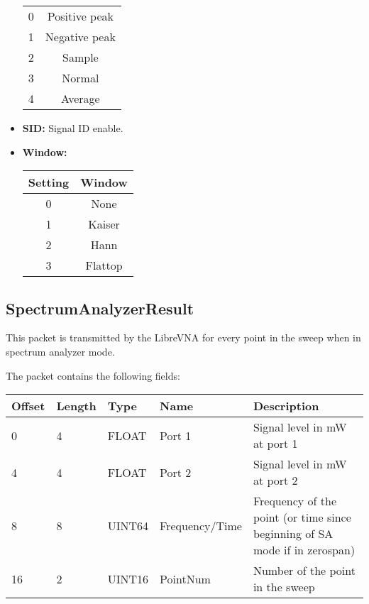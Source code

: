 \documentclass[a4paper,11pt]{article}
\begin{document}
\begin{itemize}
\begin{center}
\begin{tabular}{ c|c }
 \hline
0 & Positive peak \\
1 & Negative peak \\
2 & Sample \\
3 & Normal \\
4 & Average \\
\end{tabular}
\end{center}
\item \textbf{SID:} Signal ID enable.
\item \textbf{Window:}
\begin{center}
\begin{tabular}{ c|c }
Setting & Window\\
 \hline
0 & None \\
1 & Kaiser\\
2 & Hann\\
3 & Flattop\\
\end{tabular}
\end{center}
\end{itemize}


\subsection{SpectrumAnalyzerResult}
This packet is transmitted by the LibreVNA for every point in the sweep when in spectrum analyzer mode.

The packet contains the following fields:
\begin{ThreePartTable}
\setlength\tabcolsep{3pt}

\begin{longtable}{p{} |  p{}  |  p{}| p{} | p{}}
\toprule
\textbf{Offset} &\textbf{Length} &\textbf{Type} & \textbf{Name} &\textbf{Description} \\ 
\hline
\endhead
\midrule[\heavyrulewidth]
\endfoot  
\midrule[\heavyrulewidth]
\endlastfoot

0 & 4 & FLOAT & Port 1 & Signal level in mW at port 1 \\
4 & 4 & FLOAT & Port 2 & Signal level in mW at port 2 \\
8 & 8 & UINT64 & Frequency/Time & Frequency of the point (or time since beginning of SA mode if in zerospan) \\
16 & 2 & UINT16 & PointNum & Number of the point in the sweep \\
\end{longtable}   
\end{ThreePartTable}
\end{document}
